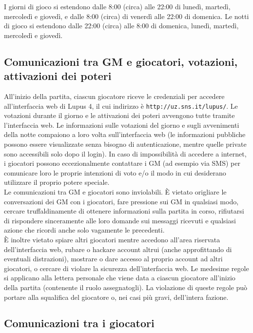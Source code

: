 \documentclass[a4paper,10pt]{article}
\begin{document}
I giorni di gioco si estendono dalle 8:00 (circa) alle 22:00 di lunedì, martedì,
mercoledì e giovedì, e dalle 8:00 (circa) di venerdì alle 22:00 di domenica.
Le notti di gioco si estendono dalle 22:00 (circa) alle 8:00 di domenica,
lunedì, martedì, mercoledì e giovedì.



\subsection{Comunicazioni tra GM e giocatori, votazioni, attivazioni dei poteri}

All'inizio della partita, ciascun giocatore riceve le credenziali per accedere
all'interfaccia web di Lupus 4, il cui indirizzo è
\verb|http://uz.sns.it/lupus/|.
Le votazioni durante il giorno e le attivazioni dei poteri avvengono tutte
tramite l'interfaccia web. Le informazioni sulle votazioni del giorno e sugli
avvenimenti della notte compaiono a loro volta sull'interfaccia web (le
informazioni pubbliche possono essere visualizzate senza bisogno di
autenticazione, mentre quelle private sono accessibili solo dopo il login).
In caso di impossibilità di accedere a internet, i giocatori possono
eccezionalmente contattare i GM (ad esempio via SMS) per comunicare loro le proprie
intenzioni di voto e/o il modo in cui desiderano utilizzare il proprio potere
speciale.\\
Le comunicazioni tra GM e giocatori sono inviolabili. È vietato origliare le
conversazioni dei GM con i giocatori, fare pressione sui GM in qualsiasi modo,
cercare truffaldinamente di ottenere informazioni sulla partita in corso,
rifiutarsi di rispondere
sinceramente alle loro domande sui messaggi ricevuti e qualsiasi azione che
ricordi anche solo vagamente le precedenti.\\
È inoltre vietato spiare altri giocatori mentre accedono all'area riservata
dell'interfaccia web, rubare o hackare account altrui (anche approfittando di
eventuali distrazioni), mostrare o dare accesso al proprio account ad altri
giocatori, o cercare di violare la sicurezza dell'interfaccia web.
Le medesime regole si applicano alla lettera personale che viene data a ciascun
giocatore all'inizio della partita (contenente il ruolo assegnatogli).
La violazione di queste regole può portare alla squalifica del giocatore o, nei
casi più gravi, dell'intera fazione.


\subsection{Comunicazioni tra i giocatori}
\end{document}
